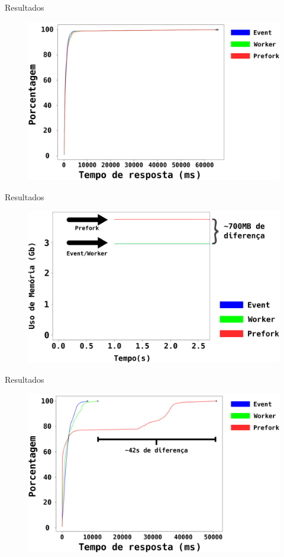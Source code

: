 \documentclass[xcolor={usenames,svgnames,dvipsnames},brazil,english,12pt,aspectratio=149]{beamer}
\begin{document}
\begin{frame}{Resultados}
  \begin{figure}[!h]
    \centering
    \includegraphics[width=.8\textwidth]{static_file}
  \end{figure}
\end{frame}

\begin{frame}{Resultados}
  \begin{figure}[!h]
    \centering
    \includegraphics[width=.7\textwidth]{static_file_memory_usage}
  \end{figure}
\end{frame}

\begin{frame}{Resultados}
  \begin{figure}[!h]
    \centering
    \includegraphics[width=.8\textwidth]{dynamic_file_request_time}
  \end{figure}
\end{frame}
\end{document}
